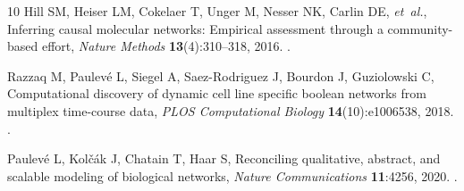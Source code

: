 \documentclass{ws-jbcb}
\numberwithin{equation}{section}
\begin{document}
\begin{thebibliography}{10}
Hill SM, Heiser LM, Cokelaer T, Unger M, Nesser NK, Carlin DE, \emph{et~al.},
  Inferring causal molecular networks: Empirical assessment through a
  community-based effort, \emph{Nature Methods} \textbf{13}(4):310--318, 2016.
\newblock {}.

Razzaq M, Paulev{\'e} L, Siegel A, Saez-Rodriguez J, Bourdon J, Guziolowski C,
  Computational discovery of dynamic cell line specific boolean networks from
  multiplex time-course data, \emph{PLOS Computational Biology}
  \textbf{14}(10):e1006538, 2018.
\newblock {}.

Paulev{\'e} L, Kol{\v{c}}{\'a}k J, Chatain T, Haar S, Reconciling qualitative,
  abstract, and scalable modeling of biological networks, \emph{Nature
  Communications} \textbf{11}:4256, 2020.
\newblock {}.

\end{thebibliography}
\end{document}
